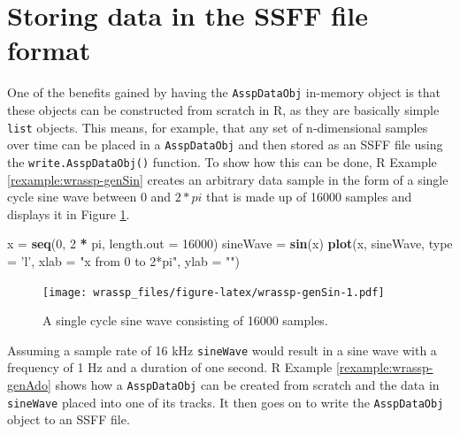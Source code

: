 \documentclass[]{book}
\newenvironment{Shaded}{\begin{snugshade}}{\end{snugshade}}
\newcommand{\DataTypeTok}[1]{\textcolor[rgb]{0.13,0.29,0.53}{#1}}
\newcommand{\DecValTok}[1]{\textcolor[rgb]{0.00,0.00,0.81}{#1}}
\newcommand{\KeywordTok}[1]{\textcolor[rgb]{0.13,0.29,0.53}{\textbf{#1}}}
\newcommand{\NormalTok}[1]{#1}
\newcommand{\OperatorTok}[1]{\textcolor[rgb]{0.81,0.36,0.00}{\textbf{#1}}}
\newcommand{\StringTok}[1]{\textcolor[rgb]{0.31,0.60,0.02}{#1}}
\theoremstyle{definition}
\theoremstyle{definition}
\theoremstyle{definition}
\theoremstyle{remark}
\begin{document}
\hypertarget{sec:wrassp_genSSFF}{%
\section{Storing data in the SSFF file
format}\label{sec:wrassp_genSSFF}}

One of the benefits gained by having the \texttt{AsspDataObj} in-memory
object is that these objects can be constructed from scratch in R, as
they are basically simple \texttt{list} objects. This means, for
example, that any set of n-dimensional samples over time can be placed
in a \texttt{AsspDataObj} and then stored as an SSFF file using the
\texttt{write.AsspDataObj()} function. To show how this can be done, R
Example \ref{rexample:wrassp-genSin} creates an arbitrary data sample in
the form of a single cycle sine wave between \(0\) and \(2*pi\) that is
made up of 16000 samples and displays it in Figure
\ref{fig:wrassp-genSin}.

\begin{Shaded}
\begin{Highlighting}[]
\NormalTok{x =}\StringTok{ }\KeywordTok{seq}\NormalTok{(}\DecValTok{0}\NormalTok{, }\DecValTok{2} \OperatorTok{*}\StringTok{ }\NormalTok{pi, }\DataTypeTok{length.out =} \DecValTok{16000}\NormalTok{)}
\NormalTok{sineWave =}\StringTok{ }\KeywordTok{sin}\NormalTok{(x)}
\KeywordTok{plot}\NormalTok{(x, sineWave, }\DataTypeTok{type =} \StringTok{'l'}\NormalTok{,}
     \DataTypeTok{xlab =} \StringTok{"x from 0 to 2*pi"}\NormalTok{,}
     \DataTypeTok{ylab =} \StringTok{""}\NormalTok{)}
\end{Highlighting}
\end{Shaded}

\begin{figure}
\centering
\texttt{[image: wrassp\_files/figure-latex/wrassp-genSin-1.pdf]}
\caption{\label{fig:wrassp-genSin}A single cycle sine wave consisting of
16000 samples.}
\end{figure}

Assuming a sample rate of 16 kHz \texttt{sineWave} would result in a
sine wave with a frequency of 1 Hz and a duration of one second. R
Example \ref{rexample:wrassp-genAdo} shows how a \texttt{AsspDataObj}
can be created from scratch and the data in \texttt{sineWave} placed
into one of its tracks. It then goes on to write the
\texttt{AsspDataObj} object to an SSFF file.
\end{document}

